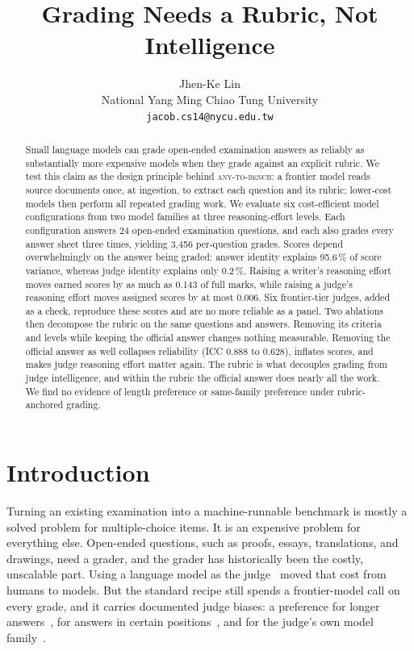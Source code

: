 \documentclass{article}
\title{Grading Needs a Rubric, Not Intelligence}
\author{Jhen-Ke Lin\\
  National Yang Ming Chiao Tung University\\
  \texttt{jacob.cs14@nycu.edu.tw}}
\begin{document}
\maketitle

\begin{abstract}
\noindent
Small language models can grade open-ended examination answers as reliably as
substantially more expensive models when they grade against an explicit
rubric. We test this claim as the design principle behind
\textsc{any-to-bench}: a frontier model reads source documents once, at
ingestion, to extract each question and its rubric; lower-cost models then
perform all repeated grading work. We evaluate six
cost-efficient model configurations from two model families at three
reasoning-effort levels. Each configuration answers 24 open-ended examination
questions, and each also grades every answer sheet three times, yielding
3{,}456 per-question grades. Scores depend overwhelmingly on the answer
being graded: answer identity explains 95.6\,\% of score variance, whereas
judge identity explains only 0.2\,\%. Raising a writer's reasoning effort
moves earned scores by as much as 0.143 of full marks, while raising a
judge's reasoning effort moves assigned scores by at most 0.006. Six
frontier-tier judges, added as a check, reproduce these scores and are no
more reliable as a panel. Two
ablations then decompose the rubric on the same questions and answers. Removing its criteria and levels while keeping the official
answer changes nothing measurable. Removing the official answer as well
collapses reliability (ICC 0.888 to 0.628), inflates scores, and makes judge
reasoning effort matter again. The rubric is what decouples grading from
judge intelligence, and within the rubric the official answer does nearly
all the work. We find no evidence of length preference or same-family
preference under rubric-anchored grading.
\end{abstract}

\section{Introduction}

Turning an existing examination into a machine-runnable benchmark is mostly a
solved problem for multiple-choice items. It is an expensive problem for
everything else. Open-ended questions, such as proofs, essays, translations,
and drawings, need a grader, and the grader has historically been the costly,
unscalable part. Using a language model as the judge~\cite{zheng2023,chiang2023}
moved that cost from humans to models. But the standard recipe still spends a
frontier-model call on every grade, and it carries documented judge biases: a
preference for longer answers~\cite{dubois2024}, for answers in certain
positions~\cite{wang2023}, and for the judge's own model
family~\cite{panickssery2024}.
\end{document}
